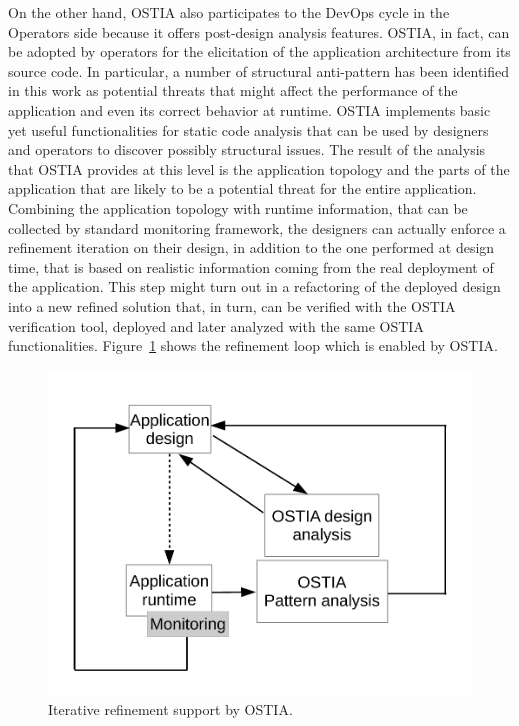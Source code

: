 {On the other hand, OSTIA  also participates to the DevOps cycle in the Operators side because it offers post-design analysis features.
OSTIA, in fact, can be adopted by operators for the elicitation of the application architecture from its source code.
In particular, a number of structural anti-pattern has been identified in this work as potential threats that might affect the performance of the application and even its correct behavior at runtime.
OSTIA implements basic yet useful functionalities for static code analysis that can be used by designers and operators to discover possibly structural issues.
The result of the analysis that OSTIA provides at this level is the application topology and the parts of the application that are likely to be a potential threat for the entire application. 
Combining the application topology with runtime information, that can be collected by standard monitoring framework, the designers can actually enforce a refinement iteration on their design, in addition to the one performed at design time, that is based on realistic information coming from the real deployment of the application.
This step might turn out in a refactoring of the deployed design into a new refined solution that, in turn, can be verified with the OSTIA verification tool, deployed and later analyzed with the same OSTIA functionalities.
Figure~\ref{fig:iterative-refinement} shows the refinement loop which is enabled by OSTIA.
\begin{figure}
	\centering
	\includegraphics[scale=0.35]{./images/refinementMethodology.pdf}
	\caption{Iterative refinement support by OSTIA.}
	\label{fig:iterative-refinement}
\end{figure}

}
